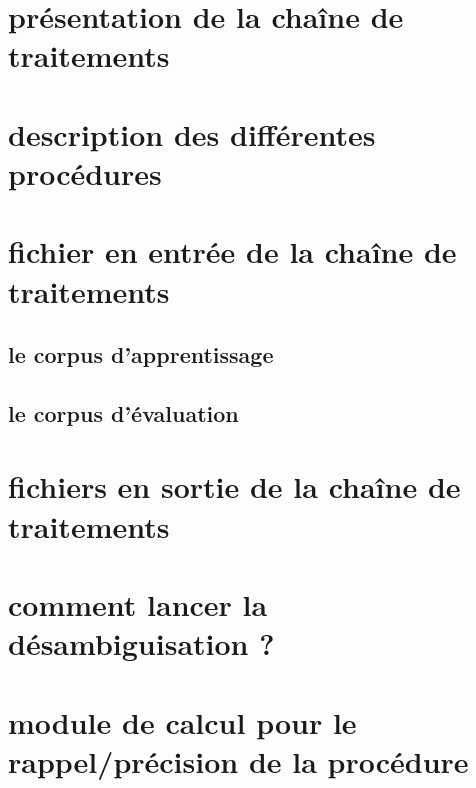 \section{présentation de la chaîne de traitements}
\section{description des différentes procédures}
\section{fichier en entrée de la chaîne de traitements}
\subsection{le corpus d'apprentissage}
\subsection{le corpus d'évaluation}
\section{fichiers en sortie de la chaîne de traitements}
\section{comment lancer la désambiguisation ?}
\section{module de calcul pour le rappel/précision de la procédure}
